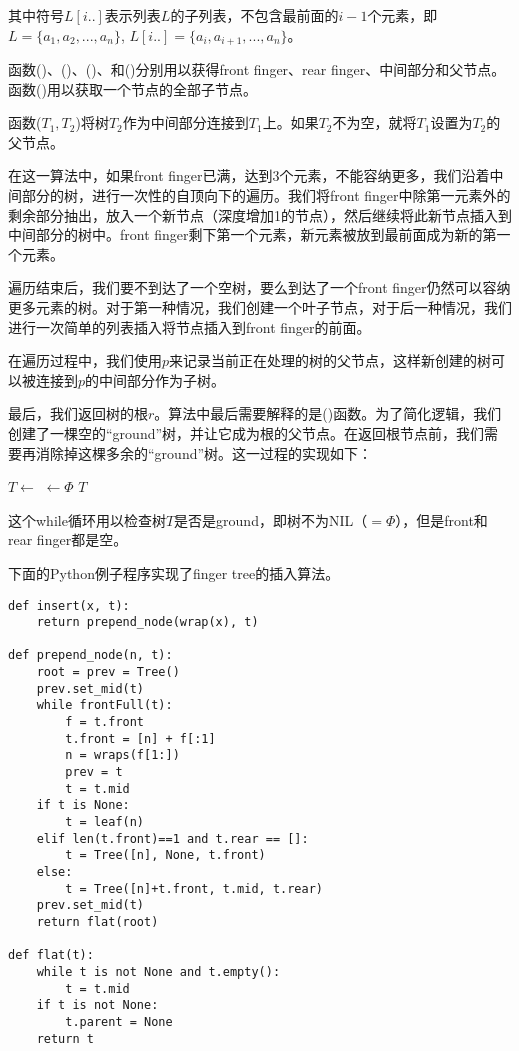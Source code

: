 \documentclass[UTF8]{article}
\begin{document}
其中符号$L[i..]$表示列表$L$的子列表，不包含最前面的$i-1$个元素，即$L = \{a_1, a_2, ..., a_n\}$, $L[i..] = \{a_i, a_{i+1}, ..., a_n\}$。

函数()、()、()、和()分别用以获得front finger、rear finger、中间部分和父节点。函数()用以获取一个节点的全部子节点。

函数($T_1, T_2$)将树$T_2$作为中间部分连接到$T_1$上。如果$T_2$不为空，就将$T_1$设置为$T_2$的父节点。

在这一算法中，如果front finger已满，达到3个元素，不能容纳更多，我们沿着中间部分的树，进行一次性的自顶向下的遍历。我们将front finger中除第一元素外的剩余部分抽出，放入一个新节点（深度增加1的节点），然后继续将此新节点插入到中间部分的树中。front finger剩下第一个元素，新元素被放到最前面成为新的第一个元素。

遍历结束后，我们要不到达了一个空树，要么到达了一个front finger仍然可以容纳更多元素的树。对于第一种情况，我们创建一个叶子节点，对于后一种情况，我们进行一次简单的列表插入将节点插入到front finger的前面。

在遍历过程中，我们使用$p$来记录当前正在处理的树的父节点，这样新创建的树可以被连接到$p$的中间部分作为子树。

最后，我们返回树的根$r$。算法中最后需要解释的是()函数。为了简化逻辑，我们创建了一棵空的“ground”树，并让它成为根的父节点。在返回根节点前，我们需要再消除掉这棵多余的“ground”树。这一过程的实现如下：

\begin{algorithmic}
    \State $T \gets$ 
  \EndWhile
    \State {} $\gets \Phi$
  \EndIf
  \State \Return $T$
\EndFunction
\end{algorithmic}

这个while循环用以检查树$T$是否是ground，即树不为NIL（$=\Phi$），但是front和rear finger都是空。

下面的Python例子程序实现了finger tree的插入算法。

\lstset{language=Python}
\begin{lstlisting}
def insert(x, t):
    return prepend_node(wrap(x), t)

def prepend_node(n, t):
    root = prev = Tree()
    prev.set_mid(t)
    while frontFull(t):
        f = t.front
        t.front = [n] + f[:1]
        n = wraps(f[1:])
        prev = t
        t = t.mid
    if t is None:
        t = leaf(n)
    elif len(t.front)==1 and t.rear == []:
        t = Tree([n], None, t.front)
    else:
        t = Tree([n]+t.front, t.mid, t.rear)
    prev.set_mid(t)
    return flat(root)

def flat(t):
    while t is not None and t.empty():
        t = t.mid
    if t is not None:
        t.parent = None
    return t
\end{lstlisting}
\end{document}
